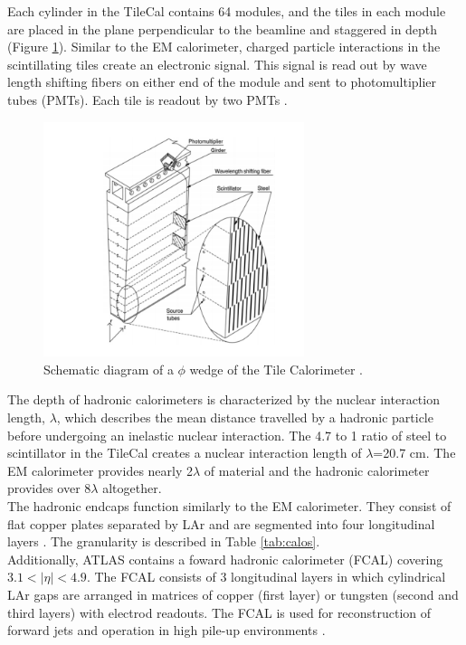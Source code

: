 Each cylinder in the TileCal contains 64 modules, and the tiles in each module are placed in the plane perpendicular to the beamline and staggered in depth (Figure \ref{fig:had_calo}). Similar to the EM calorimeter, charged particle interactions in the scintillating tiles create an electronic signal. This signal is read out by wave length shifting fibers on either end of the module and sent to photomultiplier tubes (PMTs). Each tile is readout by two PMTs \cite{tilecal}.\\ 

\begin{figure}[h]
    \centering
    \includegraphics[width=3in]{figures/chapter2/had_calo.png}
    \caption{Schematic diagram of a $\phi$ wedge of the Tile Calorimeter \cite{tilecal}.}
    \label{fig:had_calo}
\end{figure}

The depth of hadronic calorimeters is characterized by the nuclear interaction length, $\lambda$, which describes the mean distance travelled by a hadronic particle before undergoing an inelastic nuclear interaction. The 4.7 to 1 ratio of steel to scintillator in the TileCal creates a nuclear interaction length of $\lambda$=20.7 cm. The EM calorimeter provides nearly 2$\lambda$ of material and the hadronic calorimeter provides over 8$\lambda$ altogether.\\ 

The hadronic endcaps function similarly to the EM calorimeter. They consist of flat copper plates separated by LAr and are segmented into four longitudinal layers \cite{em_calo_run2}. The granularity is described in Table \ref{tab:calos}.\\

Additionally, ATLAS contains a foward hadronic calorimeter (FCAL) covering $3.1<|\eta|<4.9$. The FCAL consists of 3 longitudinal layers in which cylindrical LAr gaps are arranged in matrices of copper (first layer) or tungsten (second and third layers) with electrod readouts. The FCAL is used for reconstruction of forward jets and operation in high pile-up environments \cite{em_calo_run2}.\\ 

